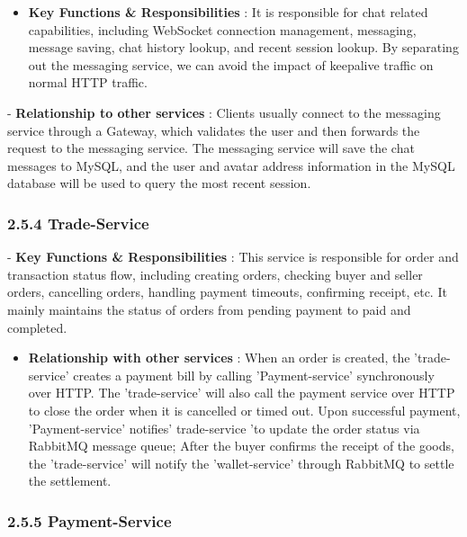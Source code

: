 \documentclass{article}
\begin{document}
\begin{itemize}
    \item \textbf{ Key Functions \& Responsibilities } : It is responsible for chat related capabilities, including WebSocket connection management, messaging, message saving, chat history lookup, and recent session lookup. By separating out the messaging service, we can avoid the impact of keepalive traffic on normal HTTP traffic.
\end{itemize}

-\textbf{ Relationship to other services } : Clients usually connect to the messaging service through a Gateway, which validates the user and then forwards the request to the messaging service. The messaging service will save the chat messages to MySQL, and the user and avatar address information in the MySQL database will be used to query the most recent session.

\subsubsection{2.5.4 Trade-Service}

-\textbf{ Key Functions \& Responsibilities } : This service is responsible for order and transaction status flow, including creating orders, checking buyer and seller orders, cancelling orders, handling payment timeouts, confirming receipt, etc. It mainly maintains the status of orders from pending payment to paid and completed.

\begin{itemize}
    \item \textbf{ Relationship with other services } : When an order is created, the 'trade-service' creates a payment bill by calling 'Payment-service' synchronously over HTTP. The 'trade-service' will also call the payment service over HTTP to close the order when it is cancelled or timed out. Upon successful payment, 'Payment-service' notifies' trade-service 'to update the order status via RabbitMQ message queue; After the buyer confirms the receipt of the goods, the 'trade-service' will notify the 'wallet-service' through RabbitMQ to settle the settlement.
\end{itemize}

\subsubsection{2.5.5 Payment-Service}
\end{document}

